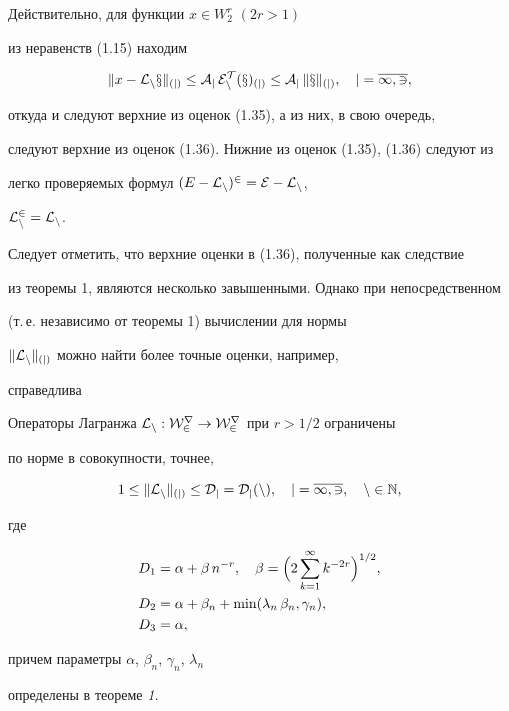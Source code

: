 Действительно, для функции $x\in W_2^r$ $(2r>1)$


из неравенств (1.15) находим


$$


\|x- \cal{L}_nx\|_{(j)}\le A_j\, E_n^T(x)_{(j)} \le


A_j\, \|x\|_{(j)},\quad j=\overline{1,3},


$$


откуда и следуют верхние из оценок (1.35), а из них, в свою очередь,


следуют верхние из оценок (1.36). Нижние из оценок (1.35), (1.36) следуют из


легко проверяемых формул $(E-\cal {L}_n)^2=E-\cal{L}_n$,


$\cal{L}_n^2=\cal{L}_n$.





Следует отметить, что верхние оценки в (1.36), полученные как следствие


из теоремы 1, являются несколько завышенными. Однако при непосредственном


(т.\,е. независимо от теоремы 1) вычислении для нормы


$\| \cal{L}_n\|_{(j)}$ можно найти более точные оценки, например,


справедлива





\begin{thm}


Операторы Лагранжа $\cal L_n: W_2^r\to W_2^r$ при $r>1/2$ ограничены


по норме в совокупности, точнее,


\begin{equation}


1\le \|\cal{L}_n\|_{(j)}\le D_j=D_j(n),\quad j=\overline{1,3},\quad


n\in \Bbb{N},


\end{equation}


где


\begin{align*}


D_1 &= \alpha +\beta\, n^{-r},\quad \beta =\Bigl( 2\sum_{k=1}^\infty


k^{-2r}\Bigr)^{1/2},\\


%


D_2 &= \alpha +\beta_n +


\min (\lambda_n\,\beta_n, \gamma_n),\\


%


D_3 &= \alpha ,


\end{align*}


причем параметры $\alpha$, $\beta_n$, $\gamma_n$, $\lambda_n$


определены в теореме {\em 1.}


\end{thm}





